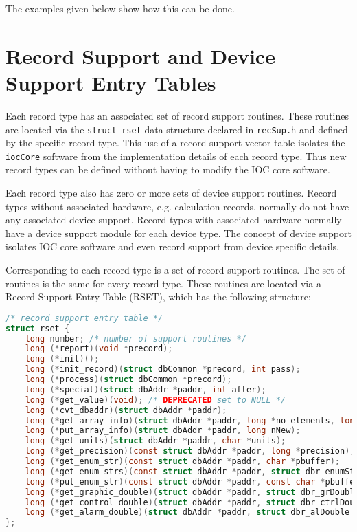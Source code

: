 The examples given below show how this can be done.

\section{Record Support and Device Support Entry Tables}

Each record type has an associated set of record support routines.
These routines are located via the \verb|struct rset| data structure declared in \verb|recSup.h| and defined by the specific record type.
This use of a record support vector table isolates the \verb|iocCore| software from the implementation details of each record type.
Thus new record types can be defined without having to modify the IOC core software.

Each record type also has zero or more sets of device support routines.
Record types without associated hardware, e.g. calculation records, normally do not have any associated device support.
Record types with associated hardware normally have a  device support module for each device type.
The concept of device support isolates IOC core software and even record support from device specific details.

Corresponding to each record type is a set of record support routines.
The set of routines is the same for every record type.
These routines are located via a Record Support Entry Table (RSET), which has the following structure:

\begin{lstlisting}[language=C]
/* record support entry table */
struct rset {
    long number; /* number of support routines */
    long (*report)(void *precord);
    long (*init)();
    long (*init_record)(struct dbCommon *precord, int pass);
    long (*process)(struct dbCommon *precord);
    long (*special)(struct dbAddr *paddr, int after);
    long (*get_value)(void); /* DEPRECATED set to NULL */
    long (*cvt_dbaddr)(struct dbAddr *paddr);
    long (*get_array_info)(struct dbAddr *paddr, long *no_elements, long *offset);
    long (*put_array_info)(struct dbAddr *paddr, long nNew);
    long (*get_units)(struct dbAddr *paddr, char *units);
    long (*get_precision)(const struct dbAddr *paddr, long *precision);
    long (*get_enum_str)(const struct dbAddr *paddr, char *pbuffer);
    long (*get_enum_strs)(const struct dbAddr *paddr, struct dbr_enumStrs *p);
    long (*put_enum_str)(const struct dbAddr *paddr, const char *pbuffer);
    long (*get_graphic_double)(struct dbAddr *paddr, struct dbr_grDouble *p);
    long (*get_control_double)(struct dbAddr *paddr, struct dbr_ctrlDouble *p);
    long (*get_alarm_double)(struct dbAddr *paddr, struct dbr_alDouble *p);
};
\end{lstlisting}

